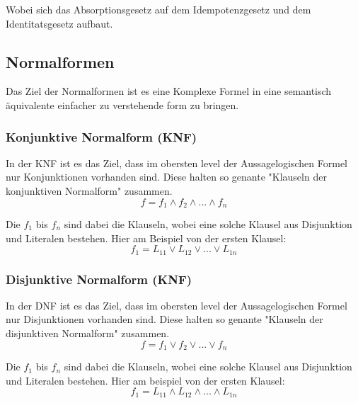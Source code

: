 \documentclass[a4paper,12pt]{article}
\begin{document}
Wobei sich das Absorptionsgesetz auf dem Idempotenzgesetz und dem Identitatsgesetz aufbaut.

\subsection{Normalformen}
Das Ziel der Normalformen ist es eine Komplexe Formel in eine semantisch äquivalente einfacher zu verstehende form zu bringen.
\subsubsection{Konjunktive Normalform (KNF)}
In der KNF ist es das Ziel, dass im obersten level der Aussagelogischen Formel nur Konjunktionen vorhanden sind. Diese halten so genante "Klauseln der konjunktiven Normalform" zusammen.
\begin{displaymath}
  f = f_1 \land f_2 \land ... \land f_n
\end{displaymath}

Die \(f_1\) bis \(f_n\) sind dabei die Klauseln, wobei eine solche Klausel aus Disjunktion und Literalen bestehen. Hier am Beispiel von der ersten Klausel:
\begin{displaymath}
  f_1 = L_{11} \lor L_{12} \lor ... \lor L_{1n}
\end{displaymath}

\subsubsection{Disjunktive Normalform (KNF)}

In der DNF ist es das Ziel, dass im obersten level der Aussagelogischen Formel nur Disjunktionen vorhanden sind. Diese halten so genante "Klauseln der disjunktiven Normalform" zusammen.
\begin{displaymath}
  f = f_1 \lor f_2 \lor ... \lor f_n
\end{displaymath}

Die \(f_1\) bis \(f_n\) sind dabei die Klauseln, wobei eine solche Klausel aus Disjunktion und Literalen bestehen. Hier am beispiel von der ersten Klausel:
\begin{displaymath}
  f_1 = L_{11} \land L_{12} \land ... \land L_{1n} 
\end{displaymath}
\end{document}

